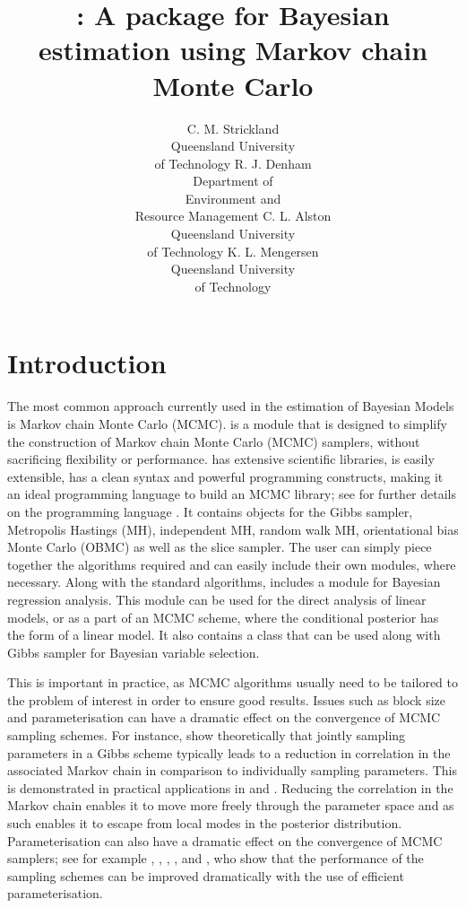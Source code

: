 \documentclass[article]{jss}
\author{C. M. Strickland\\Queensland University\\ of Technology \And 
        R. J. Denham\\Department of \\Environment and\\ Resource Management \And
        C. L. Alston\\Queensland University\\ of Technology \And 
        K. L. Mengersen\\Queensland University\\ of Technology}
\title{\pkg{PyMCMC}: A \proglang{Python} package for Bayesian estimation using Markov chain Monte Carlo}
\begin{document}
\section{Introduction}

The most common approach currently used in the estimation of Bayesian
Models is Markov chain Monte Carlo (MCMC).  is a
 module that is designed to simplify the construction
of Markov chain Monte Carlo (MCMC) samplers, without sacrificing
flexibility or performance.  has extensive scientific
libraries, is easily extensible, has a clean syntax and powerful
programming constructs, making it an ideal programming language to
build an MCMC library; see \citet{Python} for further details on the
programming language . It contains objects for the
Gibbs sampler, Metropolis Hastings (MH), independent MH, random walk
MH, orientational bias Monte Carlo (OBMC) as well as the slice
sampler. The user can simply piece together the algorithms required
and can easily include their own modules, where necessary. Along with
the standard algorithms,  includes a module for Bayesian
regression analysis. This module can be used for the direct analysis
of linear models, or as a part of an MCMC scheme, where the
conditional posterior has the form of a linear model.  It also
contains a class that can be used along with Gibbs sampler for
Bayesian variable selection.

This is important in practice, as MCMC algorithms usually need to
be tailored to the problem of interest in order to ensure good results.
Issues such as block size and parameterisation can have a dramatic
effect on the convergence of MCMC sampling schemes. For instance,
\citet{LuiKongWong1994} show theoretically that jointly sampling
parameters in a Gibbs scheme typically leads to a reduction in correlation
in the associated Markov chain in comparison to individually sampling
parameters. This is demonstrated in practical applications in \citet{CarterKohn1994}
and \citet{KimShephardChib1998}. Reducing the correlation in the
Markov chain enables it to move more freely through the parameter
space and as such enables it to escape from local modes in the posterior
distribution. Parameterisation can also have a dramatic effect on
the convergence of MCMC samplers; see for example \citet{GelfandSahuCarlin1995},
\citet{RobersSahu1997}, \citet{PittShepard1999}, \citet{RobertMengersen1999},
\citet{FruwirthSchnatter2004} and \citet{StricklandMartinForbes2008},
who show that the performance of the sampling schemes can be improved
dramatically with the use of efficient parameterisation.
\end{document}
